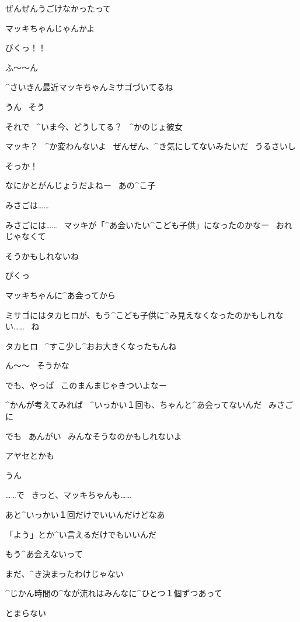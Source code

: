 \page
\Takahiro ぜんぜんうごけなかったって

\Person マッキちゃんじゃんかよ

\Makki びくっ！！

\page
\Alpha ふ〜〜ん

\Alpha ^{さいきん}{最近}マッキちゃんミサゴづいてるね

\Takahiro うん
\ そう

\page
\Alpha それで
\ ^{いま}{今}、どうしてる？
\ ^{かのじょ}{彼女}

\Takahiro マッキ？
\ ^{か}{変}わんないよ
\ ぜんぜん、^{き}{気}にしてないみたいだ
\ うるさいし

\Alpha そっか！

\Alpha なにかとがんじょうだよねー
\ あの^{こ}{子}

\Takahiro みさごは……

\page
\Takahiro みさごには……
\ マッキが「^{あ}{会}いたい^{こども}{子供}」になったのかなー
\ おれじゃなくて

\Alpha そうかもしれないね

\Takahiro ぴくっ

\page
\Alpha マッキちゃんに^{あ}{会}ってから

\Alpha ミサゴにはタカヒロが、もう^{こども}{子供}に^{み}{見}えなくなったのかもしれない……
\ ね

\page
\Alpha タカヒロ
\ ^{すこ}{少}し^{おお}{大}きくなったもんね

\page
\Takahiro ん〜〜
\ そうかな

\Takahiro でも、やっぱ
\ このまんまじゃきついよなー

\Takahiro ^{かんが}{考}えてみれば
\ ^{いっかい}{１回}も、ちゃんと^{あ}{会}ってないんだ
\ みさごに

\page
\Alpha でも
\ あんがい
\ みんなそうなのかもしれないよ

\Takahiro アヤセとかも

\Alpha うん

\Alpha ……で
\ きっと、マッキちゃんも……

\page
\Takahiro あと^{いっかい}{１回}だけでいいんだけどなあ

\Takahiro 「よう」とか^{い}{言}えるだけでもいいんだ

\Takahiro もう^{あ}{会}えないって

\Takahiro まだ、^{き}{決}まったわけじゃない

\page[104]
\Alpha ^{じかん}{時間}の^{なが}{流}れはみんなに^{ひとつ}{１個}ずつあって

\Alpha とまらない


